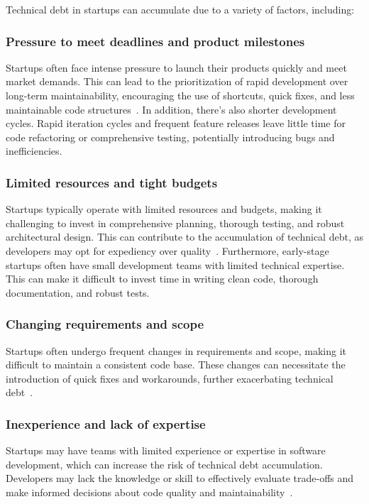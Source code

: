 Technical debt in startups can accumulate due to a variety of factors, including:
\subsubsection{Pressure to meet deadlines and product milestones}
Startups often face intense pressure to launch their products quickly and meet market demands. This can lead to the prioritization of rapid development over long-term maintainability, encouraging the use of shortcuts, quick fixes, and less maintainable code structures~\cite{Klotins:2018:ETD,Qualityv77:online}. In addition, there's also shorter development cycles. Rapid iteration cycles and frequent feature releases leave little time for code refactoring or comprehensive testing, potentially introducing bugs and inefficiencies.

\subsubsection{Limited resources and tight budgets}
Startups typically operate with limited resources and budgets, making it challenging to invest in comprehensive planning, thorough testing, and robust architectural design. This can contribute to the accumulation of technical debt, as developers may opt for expediency over quality~\cite{FowlerBottlenecks,Balancin62:online}. Furthermore, early-stage startups often have small development teams with limited technical expertise. This can make it difficult to invest time in writing clean code, thorough documentation, and robust tests.

\subsubsection{Changing requirements and scope}
Startups often undergo frequent changes in requirements and scope, making it difficult to maintain a consistent code base. These changes can necessitate the introduction of quick fixes and workarounds, further exacerbating technical debt~\cite{DesignSt86:online,Creating18:online}.

\subsubsection{Inexperience and lack of expertise} 
Startups may have teams with limited experience or expertise in software development, which can increase the risk of technical debt accumulation. Developers may lack the knowledge or skill to effectively evaluate trade-offs and make informed decisions about code quality and maintainability~\cite{Blog21:online}. 

